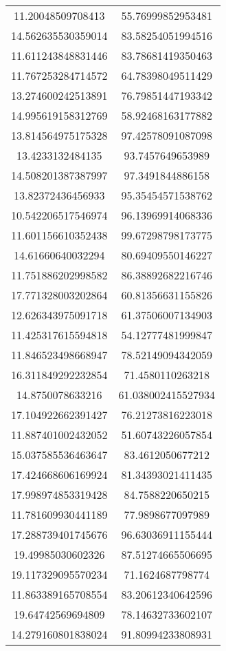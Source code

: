 \begin{table}
\begin{tabular}{cc}
11.20048509708413 & 55.76999852953481 \\
14.562635530359014 & 83.58254051994516 \\
11.611243848831446 & 83.78681419350463 \\
11.767253284714572 & 64.78398049511429 \\
13.274600242513891 & 76.79851447193342 \\
14.995619158312769 & 58.92468163177882 \\
13.814564975175328 & 97.42578091087098 \\
13.4233132484135 & 93.7457649653989 \\
14.508201387387997 & 97.3491844886158 \\
13.82372436456933 & 95.35454571538762 \\
10.542206517546974 & 96.13969914068336 \\
11.601156610352438 & 99.67298798173775 \\
14.61660640032294 & 80.69409550146227 \\
11.751886202998582 & 86.38892682216746 \\
17.771328003202864 & 60.81356631155826 \\
12.626343975091718 & 61.37506007134903 \\
11.425317615594818 & 54.12777481999847 \\
11.846523498668947 & 78.52149094342059 \\
16.311849292232854 & 71.4580110263218 \\
14.8750078633216 & 61.038002415527934 \\
17.104922662391427 & 76.21273816223018 \\
11.887401002432052 & 51.60743226057854 \\
15.037585536463647 & 83.4612050677212 \\
17.424668606169924 & 81.34393021411435 \\
17.998974853319428 & 84.7588220650215 \\
11.781609930441189 & 77.9898677097989 \\
17.288739401745676 & 96.63036911155444 \\
19.49985030602326 & 87.51274665506695 \\
19.117329095570234 & 71.1624687798774 \\
11.863389165708554 & 83.20612340642596 \\
19.64742569694809 & 78.14632733602107 \\
14.279160801838024 & 91.80994233808931 \\

\end{tabular}
\end{table}
